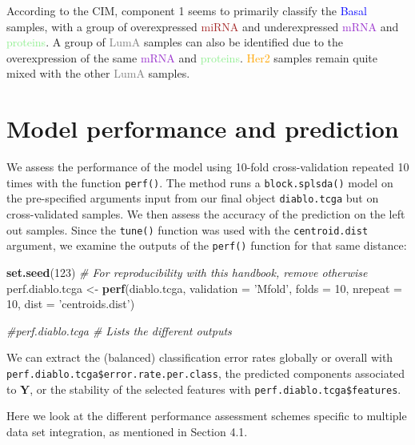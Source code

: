\documentclass[]{book}
\newenvironment{Shaded}{\begin{snugshade}}{\end{snugshade}}
\newcommand{\KeywordTok}[1]{\textcolor[rgb]{0.13,0.29,0.53}{\textbf{#1}}}
\newcommand{\DataTypeTok}[1]{\textcolor[rgb]{0.13,0.29,0.53}{#1}}
\newcommand{\DecValTok}[1]{\textcolor[rgb]{0.00,0.00,0.81}{#1}}
\newcommand{\StringTok}[1]{\textcolor[rgb]{0.31,0.60,0.02}{#1}}
\newcommand{\CommentTok}[1]{\textcolor[rgb]{0.56,0.35,0.01}{\textit{#1}}}
\newcommand{\NormalTok}[1]{#1}
\begin{document}
According to the CIM, component 1 seems to primarily classify the
\textcolor{blue}{Basal} samples, with a group of overexpressed
\textcolor{brown}{miRNA} and underexpressed \textcolor{darkorchid}{mRNA}
and \textcolor{lightgreen}{proteins}. A group of \textcolor{grey}{LumA}
samples can also be identified due to the overexpression of the same
\textcolor{darkorchid}{mRNA} and \textcolor{lightgreen}{proteins}.
\textcolor{orange}{Her2} samples remain quite mixed with the other
\textcolor{grey}{LumA} samples.

\section{Model performance and prediction}\label{diablo:perf}

We assess the performance of the model using 10-fold cross-validation
repeated 10 times with the function \texttt{perf()}. The method runs a
\texttt{block.splsda()} model on the pre-specified arguments input from
our final object \texttt{diablo.tcga} but on cross-validated samples. We
then assess the accuracy of the prediction on the left out samples.
Since the \texttt{tune()} function was used with the
\texttt{centroid.dist} argument, we examine the outputs of the
\texttt{perf()} function for that same distance:

\begin{Shaded}
\begin{Highlighting}[]
\KeywordTok{set.seed}\NormalTok{(}\DecValTok{123}\NormalTok{) }\CommentTok{# For reproducibility with this handbook, remove otherwise}
\NormalTok{perf.diablo.tcga <-}\StringTok{ }\KeywordTok{perf}\NormalTok{(diablo.tcga,  }\DataTypeTok{validation =} \StringTok{'Mfold'}\NormalTok{, }\DataTypeTok{folds =} \DecValTok{10}\NormalTok{, }
                         \DataTypeTok{nrepeat =} \DecValTok{10}\NormalTok{, }\DataTypeTok{dist =} \StringTok{'centroids.dist'}\NormalTok{)}

\CommentTok{#perf.diablo.tcga  # Lists the different outputs}
\end{Highlighting}
\end{Shaded}

We can extract the (balanced) classification error rates globally or
overall with \texttt{perf.diablo.tcga\$error.rate.per.class}, the
predicted components associated to \(\boldsymbol Y\), or the stability
of the selected features with \texttt{perf.diablo.tcga\$features}.

Here we look at the different performance assessment schemes specific to
multiple data set integration, as mentioned in Section 4.1.
\end{document}
